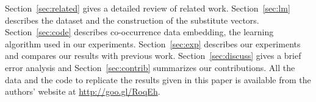 Section~\ref{sec:related} gives a detailed review of related work.
Section~\ref{sec:lm} describes the dataset and the construction of the
substitute vectors.  Section~\ref{sec:code} describes co-occurrence
data embedding, the learning algorithm used in our experiments.
Section~\ref{sec:exp} describes our experiments and compares our
results with previous work.  Section~\ref{sec:discuss} gives a brief
error analysis and Section~\ref{sec:contrib} summarizes our
contributions.  All the data and the code to replicate the results
given in this paper is available from the authors' website at
\mbox{\url{http://goo.gl/RoqEh}}.







